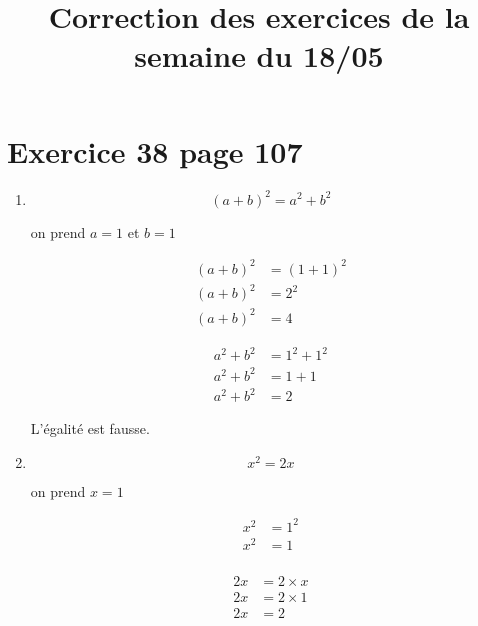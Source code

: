 \documentclass[12pt,a4paper]{article}
\title{Correction des exercices de la semaine du 18/05}
\date{}
\begin{document}
	
\maketitle

\vspace*{-1cm}

\section*{Exercice 38 page 107}


\begin{enumerate}
	
		
		
		
		
	
	\item \begin{equation*}
		(a+b)^2 = a^2+b^2
	\end{equation*}
	
	on prend $a = 1$ et $b = 1$
	
	\begin{multicols}{2}
		\begin{align*}
		(a+b)^2 &= (1 + 1)^2 \\
		(a+b)^2 &= 2^2 \\
		(a+b)^2 &= 4 
		\end{align*} 
		
		
		\begin{align*}
			a^2 + b^2 &= 1^2 + 1^2\\
			a^2 + b^2 &= 1+1 \\
			a^2 + b^2 &= 2 
		\end{align*}
		
	\end{multicols}
	
	L'égalité est fausse.
	
	
	\item \begin{equation*}
	x^2 = 2x
	\end{equation*}
	
	on prend $x = 1$ 
	
	\begin{multicols}{2}
		\begin{align*}
			x^2 &= 1^2 \\
			x^2 &= 1 \\
		\end{align*} 
		
		
		\begin{align*}
			2x &= 2 \times x \\
			2x &= 2 \times 1 \\
			2x &= 2 
		\end{align*}
		

\end{multicols}
\end{enumerate}
\end{document}
